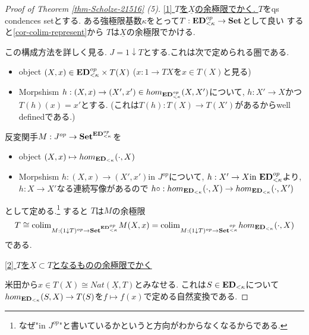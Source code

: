 \documentclass[dvipdfmx,a4paper,11pt]{report}
\newcommand{\colim}{{\rm colim}}
\theoremstyle{definition}
\begin{document}
\begin{proof}[Proof of Theorem \ref{thm-Scholze-21516} (5)]

\underline{[1] $T$を$\underline{X}$の余極限でかく. }
$T$をqs condences setとする.
ある強極限基数$\kappa$をとって$T : {\bf ED}_{<\kappa}^{op} \to {\bf Set}$として良い
すると\ref{cor-colim-represent}から
$T$は$\underline{X}$の余極限でかける.

この構成方法を詳しく見る.
$J = 1\downarrow T$とする.これは次で定められる圏である.
\begin{itemize}
\item object $(X, x) \in {\bf ED}_{<\kappa}^{op} \times T(X)$ ($x : 1 \to TX$を$x \in T(X)$と見る)
\item Morpshism $h : (X, x) \to (X', x') \in hom_{{\bf ED}_{<\kappa}^{op} } (X, X')$について, $h : X' \to X$かつ$T(h)(x)=x'$とする. (これは$T(h) : T(X) \to T(X')$があるからwell definedである.)
\end{itemize}
反変関手$M : J^{op} \to {\bf Set}^{{\bf ED}_{<\kappa}^{op} }$を
\begin{itemize}
\item object $(X, x)  \mapsto hom_{{\bf ED}_{<\kappa}} (\cdot, X)$
\item Morpshism $h : (X, x) \to (X', x') \text{in $J^{op}$}$について, $h : X' \to X \text{in ${\bf ED}_{<\kappa}^{op}$}$より, $h : X \to X'$なる連続写像があるので
$h \circ : hom_{{\bf ED}_{<\kappa}} (\cdot, X) \to hom_{{\bf ED}_{<\kappa}} (\cdot, X')$
\end{itemize}
として定める.\footnote{なぜ"in $J^{op}$"と書いているかというと方向がわからなくなるからである. }
すると
$T$は$M$の余極限%
$$
T \cong  
\colim_{M : ( 1\downarrow T)^{op} \to {\bf Set }^{{\bf ED}_{<\kappa}^{op}}} M(X,x)
=\colim_{M : ( 1\downarrow T)^{op}\to  {\bf Set }^{{\bf }_{<\kappa}^{op}}}
hom_{ {\bf ED}_{<\kappa}}(\cdot, X)
$$
である.

\underline{[2] $T$を$\underline{X} \subset T$となるものの余極限でかく }

米田から$x \in T(X) \cong Nat(\underline{X}, T)$とみなせる. これは$S \in {\bf ED}_{< \kappa}$について
$hom_{ {\bf ED}_{<\kappa}}(S, X) \to T(S)$を$f \mapsto f(x)$で定める自然変換である. 


\end{proof}
\end{document}
